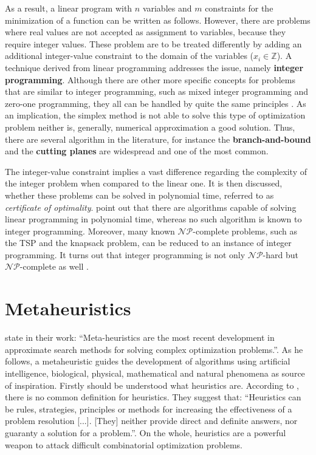 \documentclass[tuberlin,cic,tc,openright,english,noabntcite,oneside]{iiufrgs}
\begin{document}
As a result, a linear program with $n$ variables and $m$ constraints for the minimization of a function can be written as follows.
However, there are problems where real values are not accepted as assignment to variables, because they require integer values. These problem are to be treated differently by adding an additional integer-value constraint to the domain of the variables ($x_{i} \in \mathbb{Z}$). A technique derived from linear programming addresses the issue, namely \textbf{integer programming}. Although there are other more specific concepts for problems that are similar to integer programming, such as mixed integer programming and zero-one programming, they all can be handled by quite the same principles \parencite[p. 175]{shenoy_linear_2007}. As an implication, the simplex method is not able to solve this type of optimization problem neither is, generally, numerical approximation a good solution. Thus, there are several algorithm in the literature, for instance the \textbf{branch-and-bound} and the \textbf{cutting planes} are widespread and one of the most common.

The integer-value constraint implies a vast difference regarding the complexity of the integer problem when compared to the linear one. It is then discussed, whether these problems can be solved in polynomial time, referred to as \emph{certificate of optimality}. \textcite{wolsey_integer_2014} point out that there are algorithms capable of solving linear programming in polynomial time, whereas no such algorithm is known to integer programming. Moreover, many known $\mathcal{NP}$-complete problems, such as the TSP and the knapsack problem, can be reduced to an instance of integer programming. It turns out that integer programming is not only $\mathcal{NP}$-hard but $\mathcal{NP}$-complete as well \parencite[p. 21]{schrijver_theory_1998}.

\section{Metaheuristics}

\textcite[p. 1]{osman_meta-heuristics_2012} state in their work: \enquote{Meta-heuristics are the most recent development in approximate search methods for solving complex optimization problems.}. As he follows, a metaheuristic guides the development of algorithms using artificial intelligence, biological, physical, mathematical and natural phenomena as source of inspiration. Firstly should be understood what heuristics are. According to \textcite[p. 13]{carvalho_121_2004}, there is no common definition for heuristics. They suggest that: \enquote{Heuristics can be rules, strategies, principles or methods for increasing the effectiveness of a problem resolution [...]. [They] neither provide direct and definite answers, nor guaranty a solution for a problem.}. On the whole, heuristics are a powerful weapon to attack difficult combinatorial optimization problems.
\end{document}
